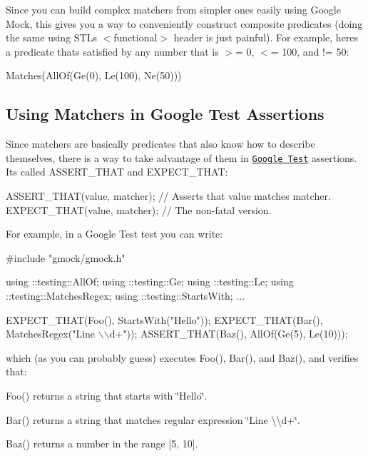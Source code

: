 Since you can build complex matchers from simpler ones easily using Google Mock, this gives you a way to conveniently construct composite predicates (doing the same using S\+TL\textquotesingle{}s {\ttfamily $<$functional$>$} header is just painful). For example, here\textquotesingle{}s a predicate that\textquotesingle{}s satisfied by any number that is $>$= 0, $<$= 100, and != 50\+:


\begin{DoxyCode}
Matches(AllOf(Ge(0), Le(100), Ne(50)))
\end{DoxyCode}


\subsection*{Using Matchers in Google Test Assertions}

Since matchers are basically predicates that also know how to describe themselves, there is a way to take advantage of them in \href{../../googletest/}{\tt Google Test} assertions. It\textquotesingle{}s called {\ttfamily A\+S\+S\+E\+R\+T\+\_\+\+T\+H\+AT} and {\ttfamily E\+X\+P\+E\+C\+T\+\_\+\+T\+H\+AT}\+:


\begin{DoxyCode}
ASSERT\_THAT(value, matcher);  \textcolor{comment}{// Asserts that value matches matcher.}
EXPECT\_THAT(value, matcher);  \textcolor{comment}{// The non-fatal version.}
\end{DoxyCode}


For example, in a Google Test test you can write\+:


\begin{DoxyCode}
\textcolor{preprocessor}{#include "gmock/gmock.h"}

using ::testing::AllOf;
using ::testing::Ge;
using ::testing::Le;
using ::testing::MatchesRegex;
using ::testing::StartsWith;
...

  EXPECT\_THAT(Foo(), StartsWith(\textcolor{stringliteral}{"Hello"}));
  EXPECT\_THAT(Bar(), MatchesRegex(\textcolor{stringliteral}{"Line \(\backslash\)\(\backslash\)d+"}));
  ASSERT\_THAT(Baz(), AllOf(Ge(5), Le(10)));
\end{DoxyCode}


which (as you can probably guess) executes {\ttfamily Foo()}, {\ttfamily Bar()}, and {\ttfamily Baz()}, and verifies that\+:


\begin{DoxyItemize}
\item {\ttfamily Foo()} returns a string that starts with {\ttfamily \char`\"{}\+Hello\char`\"{}}.
\item {\ttfamily Bar()} returns a string that matches regular expression {\ttfamily \char`\"{}\+Line \textbackslash{}\textbackslash{}d+\char`\"{}}.
\item {\ttfamily Baz()} returns a number in the range \mbox{[}5, 10\mbox{]}.
\end{DoxyItemize}

